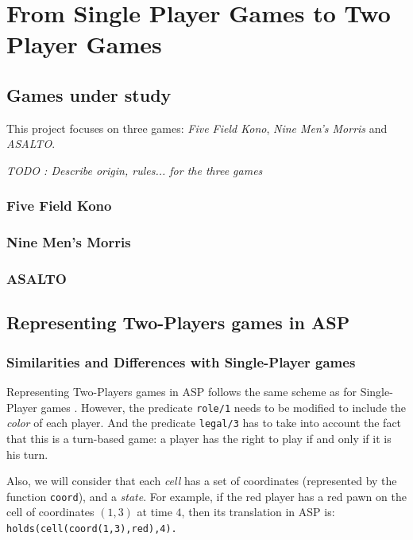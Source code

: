 
\chapter{From Single Player Games to Two Player Games}

\section{Games under study}

This project focuses on three games: \textit{Five Field Kono}, \textit{Nine Men's Morris} and \textit{ASALTO}.

\bigskip

\emph{TODO : Describe origin, rules... for the three games}


\subsection{Five Field Kono}



\subsection{Nine Men's Morris}

\subsection{ASALTO}

\section{Representing Two-Players games in ASP}

\subsection{Similarities and Differences with Single-Player games}

Representing Two-Players games in ASP follows the same scheme as for Single-Player games \cite{thielscher2009answer}. However, the predicate \texttt{role/1} needs to be modified to include the \textit{color} of each player. And the predicate \texttt{legal/3} has to take into account the fact that this is a turn-based game: a player has the right to play if and only if it is his turn.

\bigskip

Also, we will consider that each \textit{cell} has a set of coordinates (represented by the function \texttt{coord}), and a \textit{state}. For example, if the red player has a red pawn on the cell of coordinates $(1,3)$ at time $4$, then its translation in ASP is: \texttt{holds(cell(coord(1,3),red),4).}

